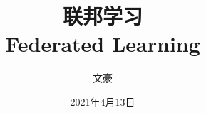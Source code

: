 
\title[FL]{\huge{联邦学习}  \\
\medskip
\small{Federated Learning}
} %

\author[文豪]{文豪} %



\date{\footnotesize 2021年4月13日} %

\setlength{\belowdisplayskip}{5pt} \setlength{\belowdisplayshortskip}{5pt}
\setlength{\abovedisplayskip}{5pt} \setlength{\abovedisplayshortskip}{5pt}


\begin{frame}
\titlepage %
\end{frame}


\begin{frame}
\tableofcontents %
\end{frame}



